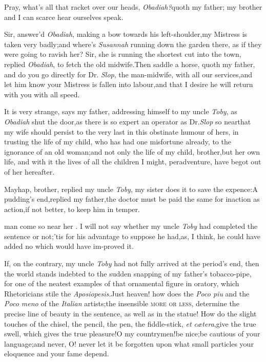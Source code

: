 \documentclass{article}
\begin{document}
Pray, what’s all that racket over our heads,
\textit{Obadiah?}\tsk quoth my father;\tsk\break
my brother and I can scarce hear ourselves speak.

Sir, answer’d \textit{Obadiah}, making a bow
towards his left-shoulder,\tsk my Mistress
is taken very badly;\tsk and where’s \textit{Susannah}
running down the garden there,
as if they were going to ravish her?\tsh\break
Sir, she is running the shortest cut into the town, replied
\textit{Obadiah}, to fetch the old midwife.\tsh Then saddle a
horse, quoth my father, and do you go directly for Dr.\@
\textit{Slop}, the man-midwife, with all our services,\tsk and
let him know your Mistress is fallen into labour,\tsk and that I
desire he will return with you with all speed.

It is very strange, says my father, addressing himself to my
uncle \textit{Toby}, as \textit{Obadiah} shut the door,\tsh as
there is so expert an operator as Dr.\@ \textit{Slop} so
near\tsk\break that my wife should persist to the very last in
this obstinate humour of hers, in trusting the life of my child,
who has had one misfortune already, to the ignorance of an old
woman;\tsh and not only the life of my child, brother,\tsh but
her own life, and with it the lives of all the children I might,
peradventure, have begot out of her hereafter.

Mayhap, brother, replied my uncle\break
\textit{Toby}, my sister does it to save the expence:\tsk A
pudding’s end,\tsk replied my father,\tsh the doctor must be
paid the same for inaction as action,\tsk if not better,\tsk
to keep him in temper.

\noindent
{}
man come so near her \astiv. I will
not say whether my uncle \textit{Toby} had completed the
sentence or not;\tsh ’tis for his advantage to suppose he
had,\tsh\break as, I think, he could have added no
 which would have im-\break proved it.

If, on the contrary, my uncle \textit{Toby} had not fully arrived
at the period’s end,\tsk\break
then the world stands indebted to
the sudden snapping of my father’s tobacco-pipe, for one of
the neatest examples of that ornamental figure in oratory, which
Rhetoricians stile the \textit{Aposiopesis.}\tsk Just
heaven! how does the \textit{Poco piu} and the \textit{Poco meno} of
the \textit{Italian} artists;\tsk the insensible \textsc{more or
less}, determine the precise line of beauty in the sentence,
as well as in the statue! How do the slight touches of the chisel,
the pencil, the pen, the fiddle-stick, \textit{et
cætera},\tsk give the true swell, which gives the true
pleasure!\tsk O my countrymen!\tsk be nice;\tsk be cautious of your
language;\tsh and never, O! never let it be forgotten upon
what small
particles your eloquence and your fame depend.
\end{document}
